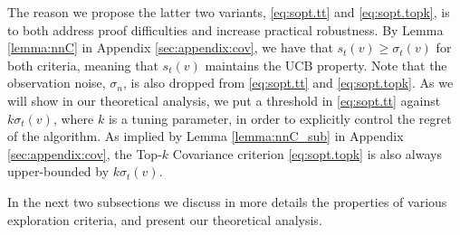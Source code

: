 The reason we propose the latter two variants, \eqref{eq:sopt.tt} and \eqref{eq:sopt.topk}, is to both address proof difficulties and increase practical robustness. By Lemma \ref{lemma:nnC} in Appendix \ref{sec:appendix:cov}, we have that $s_t(v) \geq \sigma_t(v)$ for both criteria, 
meaning that $s_t(v)$ maintains the UCB property. 
Note that the observation noise, $\sigma_n$, is also dropped from \eqref{eq:sopt.tt} and \eqref{eq:sopt.topk}. 
As we will show in our theoretical analysis, we put a threshold in \eqref{eq:sopt.tt} against $k \sigma_t(v)$, where $k$ is a tuning parameter, 
in order to explicitly control the regret of the algorithm. 
As implied by Lemma \ref{lemma:nnC_sub} in Appendix \ref{sec:appendix:cov}, the Top-$k$ Covariance criterion \eqref{eq:sopt.topk}
is also always upper-bounded by $k \sigma_t(v)$.  


In the next two subsections we discuss in more details the properties of various exploration criteria, 
and present our theoretical analysis.

